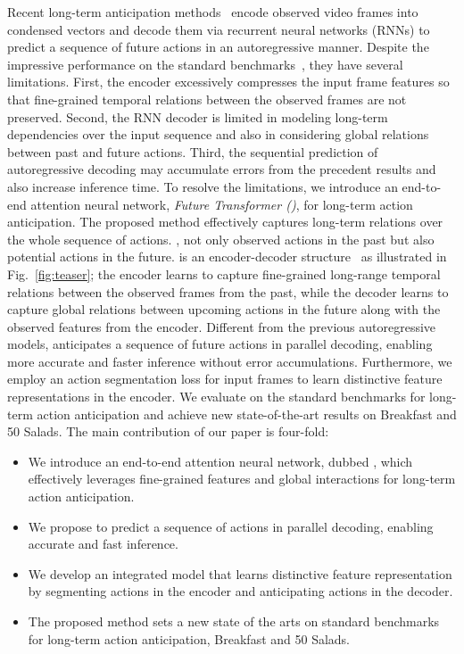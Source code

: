 
Recent long-term anticipation methods~\cite{farha2020long,sener2020temporal} encode observed video frames into condensed vectors and decode them via recurrent neural networks (RNNs) to predict a sequence of future actions in an autoregressive manner.
Despite the impressive performance on the standard benchmarks~\cite{kuehne2014language,stein2013combining}, they have several limitations.
First, the encoder excessively compresses the input frame features so that fine-grained temporal relations between the observed frames are not preserved.
Second, the RNN decoder is limited in modeling long-term dependencies over the input sequence and also in considering global relations between past and future actions.
Third, the sequential prediction of autoregressive decoding may accumulate errors from the precedent results and also increase inference time.
To resolve the limitations, we introduce an end-to-end attention neural network, \textit{Future Transformer (\ours)}, 
for long-term action anticipation. The proposed method effectively captures long-term relations over the whole sequence of actions. 
\ie, not only observed actions in the past but also potential actions in the future.
\ours is an encoder-decoder structure~\cite{vaswani2017attention,carion2020end} as illustrated in Fig.~\ref{fig:teaser}; the encoder learns to capture fine-grained long-range temporal relations between the observed frames from the past, while the decoder learns to capture global relations between upcoming actions in the future along with the observed features from the encoder.
Different from the previous autoregressive models, \ours anticipates a sequence of future actions in parallel decoding, enabling more accurate and faster inference without error accumulations.
Furthermore, we employ an action segmentation loss for input frames to learn distinctive feature representations in the encoder.
We evaluate \ours on the standard benchmarks for long-term action anticipation and achieve new state-of-the-art results on Breakfast and 50 Salads.
The main contribution of our paper is four-fold:
\begin{itemize}
    \item We introduce an end-to-end attention neural network, dubbed \ours, which effectively leverages fine-grained features and global interactions for long-term action anticipation.
    \item We propose to predict a sequence of actions in parallel decoding, enabling accurate and fast inference.
    \item We develop an integrated model that learns distinctive feature representation by segmenting actions in the encoder and anticipating actions in the decoder.
    \item The proposed method sets a new state of the arts on standard benchmarks for long-term action anticipation, Breakfast and 50 Salads.
\end{itemize}